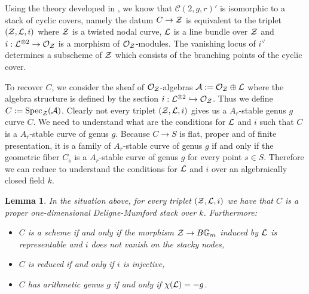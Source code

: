 \documentclass{alggeom}
\numberwithin{equation}{section}
\numberwithin{subsection}{section}
\newtheorem{lemma}[theorem]{Lemma}
\theoremstyle{definition}
\theoremstyle{remark}
\newcommand\cA{\mathcal{A}} \newcommand\cB{\mathcal{B}}
\newcommand\cC{\mathcal{C}} \newcommand\cD{\mathcal{D}}
\newcommand\cO{\mathcal{O}} \newcommand\cP{\mathcal{P}}
\newcommand\GG{\mathbb{G}} \newcommand\HH{\mathbb{H}}
\newcommand\spec{\operatorname{Spec}}
\begin{document}
Using the theory developed in \cite{ArVis}, we know that $\cC(2,g,r)'$ is isomorphic to a stack of cyclic covers, namely the datum $C\rightarrow \mathcal{Z}$ is equivalent to the triplet $(\mathcal{Z},\mathcal{L},i)$ where $\mathcal{Z}$ is a twisted nodal curve, $\mathcal{L}$ is a line bundle over $\mathcal{Z}$ and $i:\cL^{\otimes 2}\rightarrow \cO_{\cZ}$ is a morphism of $\cO_{\cZ}$-modules. The vanishing locus of $i^{\vee}$ determines a subscheme of $\mathcal{Z}$ which consists of the branching points of the cyclic cover. 

To recover $C$, we consider the sheaf of $\cO_{\cZ}$-algebras $\cA:=\cO_{\cZ}\oplus \cL$ where the algebra structure is defined by the section $i:\cL^{\otimes 2}\hookrightarrow \cO_{\cZ}$. Thus we define $C:=\spec_{\cZ}(\cA)$. Clearly not every triplet $(\mathcal{Z},\mathcal{L},i)$ gives us a $A_r$-stable genus $g$ curve $C$. We need to understand what are the conditions for $\mathcal{L}$ and $i$ such that $C$ is a $A_r$-stable curve of genus $g$. Because $C\rightarrow S$ is flat, proper and of finite presentation, it is a family of $A_r$-stable curve of genus $g$ if and only if the geometric fiber $C_{s}$ is a $A_r$-stable curve of genus $g$ for every point $s \in S$. Therefore we can reduce to understand the conditions for $\mathcal{L}$ and $i$ over an algebraically closed field $k$. 

\begin{lemma}
	In the situation above, for every triplet $(\mathcal{Z},\mathcal{L},i)$ we have that $C$ is a proper one-dimensional Deligne-Mumford stack over $k$. Furthermore:
	\begin{itemize}
		\item[(i)] $C$ is a scheme if and only if the morphism $\cZ \rightarrow B\GG_m$ induced by $\mathcal{L}$ is representable and $i$ does not vanish on the stacky nodes, 
		\item[(ii)] $C$ is reduced if and only if $i$ is injective,
		\item[(iii)] $C$ has arithmetic genus $g$ if and only if $\chi(\mathcal{L})=-g$.
	\end{itemize}
\end{lemma}
\end{document}
